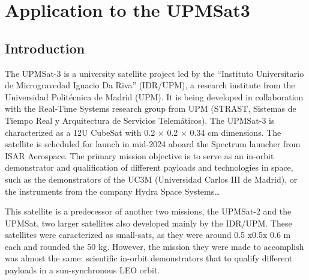 \chapter{Application to the UPMSat3}
\section{Introduction}

The UPMSat-3 is a university satellite project led by the “Instituto Universitario de Microgravedad  Ignacio Da Riva” (IDR/UPM), a research institute from the Universidad Politécnica de Madrid (UPM). It is being developed in collaboration with the Real-Time Systems research group from UPM (STRAST, Sistemas de Tiempo Real y Arquitectura de Servicios Telemáticos). The UPMSat-3 is characterized as a 12U CubeSat with 0.2 × 0.2 × 0.34 cm dimensions. The satellite is scheduled for launch in mid-2024 aboard the Spectrum launcher from ISAR Aerospace. 
The primary mission objective is to serve as an in-orbit demonstrator and qualification of
different payloads and technologies in space, such as the demonstrators of the UC3M (Universidad Carlos III de Madrid), or the instruments from the company Hydra Space Systems\dots

This satellite is a predecessor of another two missions, the UPMSat-2 and the UPMSat, two larger satellites also developed mainly by the IDR/UPM. These satellites were caracterized as small-sats, as they were around 0.5 x0.5x 0.6 m each and rounded the 50 kg. However, the mission they were made to accomplish was almost the same: scientific in-orbit demonstrators that to qualify different payloads in a sun-synchronous LEO orbit.


